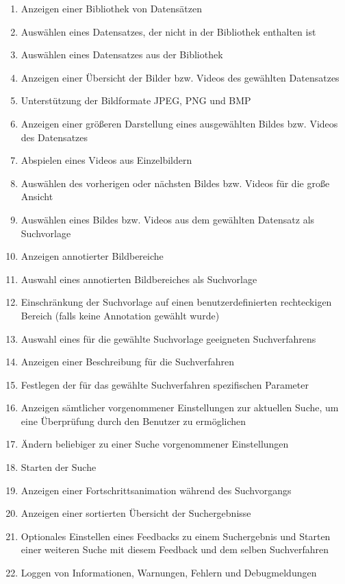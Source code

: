 \begin{enumerate} [label=\bfseries /F \arabic*0/, leftmargin=*]
	\item Anzeigen einer Bibliothek von Datensätzen \chk
	\item Auswählen eines Datensatzes, der nicht in der Bibliothek enthalten ist \chk
	\item Auswählen eines Datensatzes aus der Bibliothek \chk
	\item Anzeigen einer Übersicht der Bilder bzw. Videos des gewählten Datensatzes \chk
	\item Unterstützung der Bildformate JPEG, PNG und BMP \chk
	\item Anzeigen einer größeren Darstellung eines ausgewählten Bildes bzw. Videos des Datensatzes \chk
	\item Abspielen eines Videos aus Einzelbildern \chk
	\item Auswählen des vorherigen oder nächsten Bildes bzw. Videos für die große Ansicht \chk
	\item Auswählen eines Bildes bzw. Videos aus dem gewählten Datensatz als Suchvorlage \chk
	\item Anzeigen annotierter Bildbereiche \chk
	\item Auswahl eines annotierten Bildbereiches als Suchvorlage \chk
	\item Einschränkung der Suchvorlage auf einen benutzerdefinierten rechteckigen Bereich (falls keine Annotation gewählt wurde) \chk
	\item Auswahl eines für die gewählte Suchvorlage geeigneten Suchverfahrens \chk
	\item Anzeigen einer Beschreibung für die Suchverfahren \chk
	\item Festlegen der für das gewählte Suchverfahren spezifischen Parameter \chk
	\item Anzeigen sämtlicher vorgenommener Einstellungen zur aktuellen Suche, um eine Überprüfung durch den Benutzer zu ermöglichen \chk
	\item Ändern beliebiger zu einer Suche vorgenommener Einstellungen \chk
	\newline
	\item Starten der Suche \chk
	\item Anzeigen einer Fortschrittsanimation während des Suchvorgangs \chk
	\newline
	\item Anzeigen einer sortierten Übersicht der Suchergebnisse \chk
	\item Optionales Einstellen eines Feedbacks zu einem Suchergebnis und Starten einer weiteren Suche mit diesem Feedback und dem selben Suchverfahren \chk
	
	\item Loggen von Informationen, Warnungen, Fehlern und Debugmeldungen \chk
	 
\end{enumerate}

